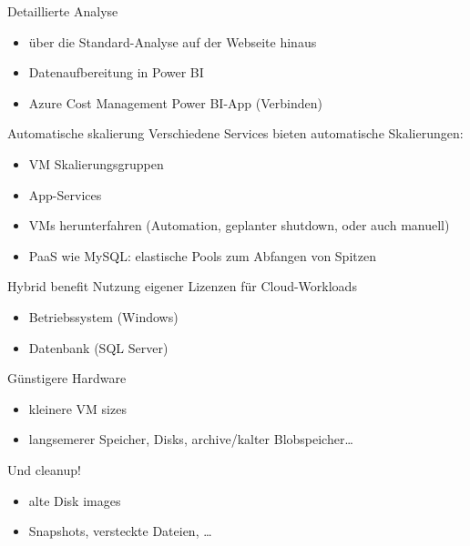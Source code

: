 \begin{flashcard}[Definition]{Detaillierte Analyse}
  \begin{itemize}
    \item über die Standard-Analyse auf der Webseite hinaus
    \item Datenaufbereitung in Power BI
    \item Azure Cost Management Power BI-App (Verbinden)
  \end{itemize}
\end{flashcard}


\begin{flashcard}[Definition]{Automatische skalierung}
  Verschiedene Services bieten automatische Skalierungen:
  \begin{itemize}
    \item VM Skalierungsgruppen
    \item App-Services
    \item VMs herunterfahren (Automation, geplanter shutdown, oder auch manuell)
    \item PaaS wie MySQL: elastische Pools zum Abfangen von Spitzen
  \end{itemize}
\end{flashcard}

\begin{flashcard}[Definition]{Hybrid benefit}
  Nutzung eigener Lizenzen für Cloud-Workloads
  \begin{itemize}
    \item Betriebssystem (Windows)
    \item Datenbank (SQL Server)
  \end{itemize}
\end{flashcard}

\begin{flashcard}[Definition]{Günstigere Hardware}
  \begin{itemize}
    \item kleinere VM sizes
    \item langsemerer Speicher, Disks, archive/kalter Blobspeicher\ldots
  \end{itemize}
  Und cleanup!
  \begin{itemize}
    \item alte Disk images
    \item Snapshots, versteckte Dateien, \ldots
  \end{itemize}
\end{flashcard}

